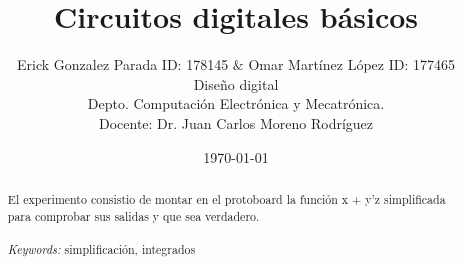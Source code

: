 \documentclass{article}
\begin{document}

\renewcommand{\footrulewidth}{1pt}
\renewcommand{\tablename}{Tabla}
\renewcommand{\figurename}{Figura}


\title{Circuitos digitales básicos}
\author{\small{Erick Gonzalez Parada ID: 178145 $\&$ Omar Martínez López ID: 177465} 
\\ \small{Diseño digital}
\\ \small{Depto. Computación Electrónica y Mecatrónica.}
\\ \small{Docente: Dr. Juan Carlos Moreno Rodríguez}}
\date{\small{\today}}

\maketitle


\begin{abstract}
El experimento consistio de montar en el protoboard la función x + y'z simplificada para comprobar sus salidas y que sea verdadero.
\\
\\
{\it Keywords:}  simplificación, integrados  
\\
\\
\end{abstract}
\end{document}
